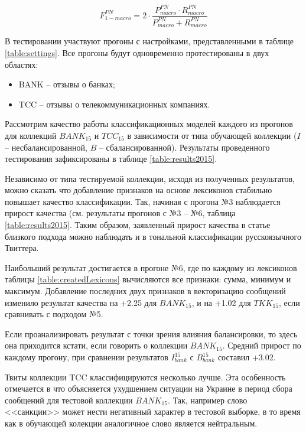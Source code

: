 \begin{equation}
    \label{eq:fmacro12}
    F_{1-macro}^{PN} = 2 \cdot \dfrac{P_{macro}^{PN} \cdot
        R_{macro}^{PN}}{P_{macro}^{PN} + R_{macro}^{PN}}
\end{equation}

В тестировании участвуют прогоны с настройками, представленными в таблице
\ref{table:settings}.
Все прогоны будут одновременно протестированы в двух областях:
\begin{itemize}
    \item BANK -- отзывы о банках;
    \item TCC -- отзывы о телекоммуникационных компаниях.
\end{itemize}



Рассмотрим качество работы классификационных моделей каждого из прогонов для
коллекций $BANK_{15}$ и $TCC_{15}$ в зависимости от типа обучающей коллекции
($I$ -- несбалансированной, $B$ -- сбалансированной).
Результаты проведенного тестирования зафиксированы в таблице \ref{table:results2015}.



Независимо от типа тестируемой коллекции, исходя из полученных результатов,
можно сказать что добавление признаков на основе лексиконов стабильно
повышает качество классификации.
Так, начиная с прогона №3 наблюдается прирост качества (см. результаты
прогонов с №3 -- №6, таблица \ref{table:results2015}.
Таким образом, заявленный прирост качества в статье близкого подхода
\cite{modernApproach} можно наблюдать и в тональной классификации русскоязычного
Твиттера.

Наибольший результат достигается в прогоне №6, где по каждому из лексиконов таблицы
\ref{table:createdLexicons} вычисляются все признаки: сумма, минимум и максимум.
Добавление последних двух признаков в векторизацию сообщений изменило
результат качества на +2.25 для $BANK_{15}$, и на +1.02 для $TKK_{15}$, если
сравнивать с подходом №5.

Если проанализировать результат с точки зрения влияния балансировки, то
здесь она приходится кстати, если говорить о коллекции $BANK_{15}$.
Средний прирост по каждому прогону, при сравнении результатов $I_{bank}^{15}$
с $B_{bank}^{15}$ составил +3.02.

Твиты коллекции TCC классифицируются несколько лучше. Эта особенность
отмечается в \cite{tonalityAnalysis} что объясняется ухудшением ситуации на
Украине в период сбора сообщений для тестовой коллекции $BANK_{15}$.
Так, например слово <<санкции>> может нести негативный характер в тестовой
выборке, в то время как в обучающей колекции аналогичное слово является
нейтральным.

